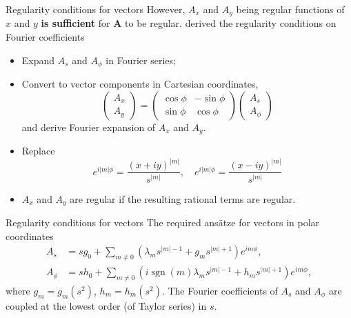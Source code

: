 \documentclass[11pt,aspectratio=169]{beamer}
\DeclareMathOperator{\sgn}{sgn}
\begin{document}
\begin{frame}{Regularity conditions for vectors}
	However, $A_x$ and $A_y$ being regular functions of $x$ and $y$ \textbf{is sufficient} for $\mathbf{A}$ to be regular.
	\textcite{lewis_physical_1990} derived the regularity conditions on Fourier coefficients
	\begin{itemize}
		\item Expand $A_s$ and $A_\phi$ in Fourier series;
		\item Convert to vector components in Cartesian coordinates, 
		\[
			\begin{pmatrix} A_x \\ A_y \end{pmatrix} = 
			\begin{pmatrix} \cos\phi & -\sin\phi \\ \sin\phi & \cos\phi \end{pmatrix} 
			\begin{pmatrix} A_s \\ A_\phi \end{pmatrix}
		\]
		and derive Fourier expansion of $A_x$ and $A_y$.
		\item Replace
		\[
			e^{i|m|\phi} = \frac{(x + iy)^{|m|}}{s^{|m|}},\quad e^{i|m|\phi} = \frac{(x - iy)^{|m|}}{s^{|m|}}
		\] 
		\item $A_x$ and $A_y$ are regular if the resulting rational terms are regular.
		\end{itemize}
\end{frame}

\begin{frame}{Regularity conditions for vectors}
	The required ansätze for vectors in polar coordinates
	\[\begin{aligned}
		A_s &= s g_0 + \sum_{m\neq 0} \left(\lambda_m s^{|m|-1} + g_m s^{|m|+1}\right) e^{im\phi}, \\ 
		A_\phi &= s h_0 + \sum_{m\neq 0} \left(i \sgn(m) \lambda_m s^{|m|-1} + h_m s^{|m|+1}\right) e^{im\phi},
	\end{aligned}\]
	where $g_m = g_m(s^2)$, $h_m = h_m(s^2)$. The Fourier coefficients of $A_s$ and $A_\phi$ are coupled at the lowest order (of Taylor series) in $s$.
\end{frame}
\end{document}
